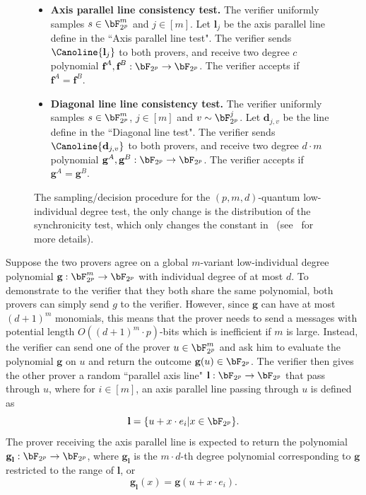 \begin{figure}[!htbp]
\begin{gamespec}
\begin{itemize}
			\item \textbf{Axis parallel line consistency test.} The verifier uniformly samples $s \in \bF_{2^p}^m$ and $j \in [m]$. Let $\textbf{l}_j$ be the axis parallel line define in the ``Axis parallel line test". The verifier sends $\Canoline{\textbf{l}_j}$ to both provers, and receive two degree $c$ polynomial $\textbf{f}^A, \textbf{f}^B:  \bF_{2^p} \rightarrow \bF_{2^p}$. The verifier accepts if $\textbf{f}^A = \textbf{f}^B$.
			\item \textbf{Diagonal line line consistency test.} The verifier uniformly samples $s \in \bF_{2^p}^m$, $j \in [m]$ and $v \sim \bF_{2^p}^j$. Let $\textbf{d}_{j,v}$ be the line define in the ``Diagonal line test". The verifier sends $\Canoline{\textbf{d}_{j,v}}$ to both provers, and receive two degree $d \cdot m$ polynomial $\textbf{g}^A, \textbf{g}^B:  \bF_{2^p} \rightarrow \bF_{2^p}$. The verifier accepts if $\textbf{g}^A = \textbf{g}^B$.
		\end{itemize} 
		\vspace{1em}
	\end{gamespec}
	\caption{The sampling/decision procedure for the $(p,m,d)$-quantum low-individual degree test, the only change is the distribution of the synchronicity test, which only changes the constant in~ (see~\cite[Section 4.1]{jiQuantumSoundnessTesting2022} for more details).}
	\label{fig:LDTdescription}
\end{figure}

Suppose the two provers agree on a global $m$-variant low-individual degree polynomial $\textbf{g}: \bF_{2^p}^m \rightarrow \bF_{2^p}$ with individual degree of at most $d$. To demonstrate to the verifier that they both share the same polynomial, both provers can simply send $g$ to the verifier. However, since $\textbf{g}$ can have at most $(d+1)^{m}$ monomials, this means that the prover needs to send a messages with potential length $O((d+1)^{m} \cdot p)$-bits which is inefficient if $m$ is large. Instead, the verifier can send one of the prover $u \in \bF_{2^p}^m$ and ask him to evaluate the polynomial $\textbf{g}$ on $u$ and return the outcome $\textbf{g}(u) \in \bF_{2^p}$. The verifier then gives the other prover a random ``parallel axis line" $\textbf{l}: \bF_{2^p} \rightarrow\bF_{2^p}$ that pass through $u$, where for $i \in [m]$, an axis parallel line passing through $u$ is defined as 
\begin{equation} \label{eq:axisparallelline}
	\textbf{l} = \{ u + x \cdot e_i | x \in \bF_{2^p} \}.
\end{equation}
The prover receiving the axis parallel line is expected to return the polynomial $\textbf{g}_\textbf{l}: \bF_{2^p} \rightarrow\bF_{2^p}$, where $\textbf{g}_\textbf{l}$ is the $m \cdot d$-th degree polynomial corresponding to $\textbf{g}$ restricted to the range of $\textbf{l}$, or
\begin{equation*}
	\textbf{g}_\textbf{l}(x) = \textbf{g}(u + x \cdot e_i). 
\end{equation*}

